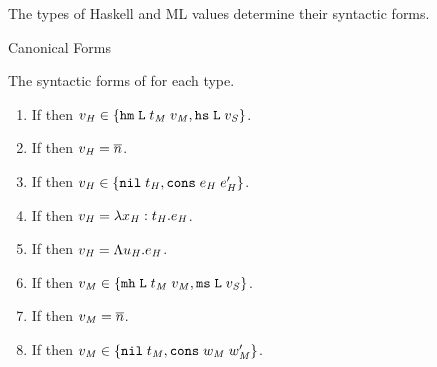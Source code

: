 The types of Haskell and ML values determine their syntactic forms.

\begin{lemma}{Canonical Forms}

\label{lemcan}

The syntactic forms of \prouvs for each type.

\begin{enumerate}



\item If \judeh{\env}{\varvalfh}{\tylump} then $v_{\mathit{H}} \in \lbrace \mathtt{hm} \; \mathtt{L} \; t_{\mathit{M}} \; v_{\mathit{M}}, \mathtt{hs} \; \mathtt{L} \; v_{\mathit{S}} \rbrace$.


\item If \judeh{\env}{\varvalfh}{\tynum} then $v_{\mathit{H}} = \overline{n}$.


\item If \judeh{\env}{\varvalfh}{\tylist{\vartyh}} then $v_{\mathit{H}} \in \lbrace \mathtt{nil} \; t_{\mathit{H}}, \mathtt{cons} \; e_{\mathit{H}} \; e_{\mathit{H}}' \rbrace$.


\item If \judeh{\env}{\varvalfh}{\tyfun{\first{\vartyh}}{\second{\vartyh}}} then $v_{\mathit{H}} = \lambda x_{\mathit{H}} : t_{\mathit{H}} . e_{\mathit{H}}$.


\item If \judeh{\env}{\varvalfh}{\tyfor{\tyvarh}{\vartyh}} then $v_{\mathit{H}} = \Lambda u_{\mathit{H}} . e_{\mathit{H}}$.



\item If \judem{\env}{\varvalfm}{\tylump} then $v_{\mathit{M}} \in \lbrace \mathtt{mh} \; \mathtt{L} \; t_{\mathit{M}} \; v_{\mathit{M}}, \mathtt{ms} \; \mathtt{L} \; v_{\mathit{S}} \rbrace$.


\item If \judem{\env}{\varvalfm}{\tynum} then $v_{\mathit{M}} = \overline{n}$.


\item If \judem{\env}{\varvalfm}{\tylist{\vartym}} then $v_{\mathit{M}} \in \lbrace \mathtt{nil} \; t_{\mathit{M}}, \mathtt{cons} \; w_{\mathit{M}} \; w_{\mathit{M}}' \rbrace$.



\end{enumerate}
\end{lemma}
